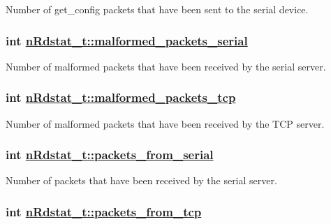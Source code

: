 Number of get\_\-config packets that have been sent to the serial device. \hypertarget{structnRdstat__t_ea478ea425e07a7511bb8dc909c049ca}{
\subsubsection[malformed\_\-packets\_\-serial]{\setlength{\rightskip}{0pt plus 5cm}int \hyperlink{structnRdstat__t_ea478ea425e07a7511bb8dc909c049ca}{n\-Rdstat\_\-t::malformed\_\-packets\_\-serial}}}
\label{structnRdstat__t_ea478ea425e07a7511bb8dc909c049ca}


Number of malformed packets that have been received by the serial server. \hypertarget{structnRdstat__t_518d1b1a04c73f328e18e8dfec9691a7}{
\subsubsection[malformed\_\-packets\_\-tcp]{\setlength{\rightskip}{0pt plus 5cm}int \hyperlink{structnRdstat__t_518d1b1a04c73f328e18e8dfec9691a7}{n\-Rdstat\_\-t::malformed\_\-packets\_\-tcp}}}
\label{structnRdstat__t_518d1b1a04c73f328e18e8dfec9691a7}


Number of malformed packets that have been received by the TCP server. \hypertarget{structnRdstat__t_dfc822591f9e821e6835fc009158b187}{
\subsubsection[packets\_\-from\_\-serial]{\setlength{\rightskip}{0pt plus 5cm}int \hyperlink{structnRdstat__t_dfc822591f9e821e6835fc009158b187}{n\-Rdstat\_\-t::packets\_\-from\_\-serial}}}
\label{structnRdstat__t_dfc822591f9e821e6835fc009158b187}


Number of packets that have been received by the serial server. \hypertarget{structnRdstat__t_346e4fe879447dbe64689e46401d07d1}{
\subsubsection[packets\_\-from\_\-tcp]{\setlength{\rightskip}{0pt plus 5cm}int \hyperlink{structnRdstat__t_346e4fe879447dbe64689e46401d07d1}{n\-Rdstat\_\-t::packets\_\-from\_\-tcp}}}
\label{structnRdstat__t_346e4fe879447dbe64689e46401d07d1}


